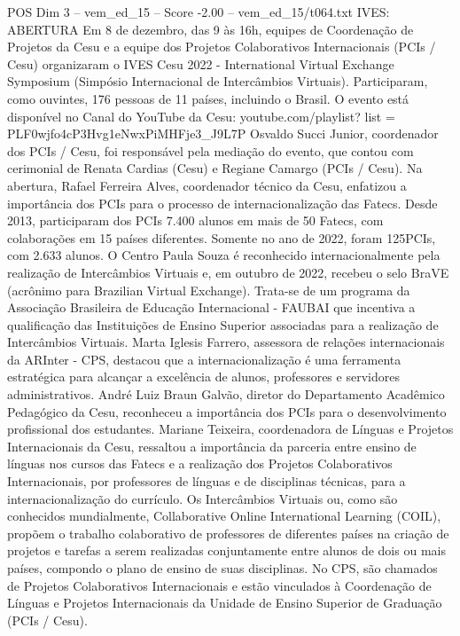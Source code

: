 \begin{textsample}{POS Dim 3 – vem\_ed\_15 – Score -2.00 – vem\_ed\_15/t064.txt}  \label{ex:f3_pos_087}
IVES: ABERTURA Em 8 de dezembro, das 9 às 16h, equipes de Coordenação de Projetos da Cesu e a equipe dos Projetos Colaborativos Internacionais (PCIs / Cesu) organizaram o IVES Cesu 2022 - International Virtual Exchange Symposium (Simpósio Internacional de Intercâmbios Virtuais).
Participaram, como ouvintes, 176 pessoas de 11 países, incluindo o Brasil.
O evento está disponível no Canal do YouTube da Cesu: youtube.com/playlist? list = PLF0wjfo4cP3Hvg1eNwxPiMHFje3\_J9L7P Osvaldo Succi Junior, coordenador dos PCIs / Cesu, foi responsável pela mediação do evento, que contou com cerimonial de Renata Cardias (Cesu) e Regiane Camargo (PCIs / Cesu).
Na abertura, Rafael Ferreira Alves, coordenador técnico da Cesu, enfatizou a importância dos PCIs para o processo de internacionalização das Fatecs.
Desde 2013, participaram dos PCIs 7.400 alunos em mais de 50 Fatecs, com colaborações em 15 países diferentes.
Somente no ano de 2022, foram 125PCIs, com 2.633 alunos.
O Centro Paula Souza é reconhecido internacionalmente pela realização de Intercâmbios Virtuais e, em outubro de 2022, recebeu o selo BraVE (acrônimo para Brazilian Virtual Exchange).
Trata-se de um programa da Associação Brasileira de Educação Internacional - FAUBAI que incentiva a qualificação das Instituições de Ensino Superior associadas para a realização de Intercâmbios Virtuais.
Marta Iglesis Farrero, assessora de relações internacionais da ARInter - CPS, destacou que a internacionalização é uma ferramenta estratégica para alcançar a excelência de alunos, professores e servidores administrativos.
André Luiz Braun Galvão, diretor do Departamento Acadêmico Pedagógico da Cesu, reconheceu a importância dos PCIs para o desenvolvimento profissional dos estudantes.
Mariane Teixeira, coordenadora de Línguas e Projetos Internacionais da Cesu, ressaltou a importância da parceria entre ensino de línguas nos cursos das Fatecs e a realização dos Projetos Colaborativos Internacionais, por professores de línguas e de disciplinas técnicas, para a internacionalização do currículo.
Os Intercâmbios Virtuais ou, como são conhecidos mundialmente, Collaborative Online International Learning (COIL), propõem o trabalho colaborativo de professores de diferentes países na criação de projetos e tarefas a serem realizadas conjuntamente entre alunos de dois ou mais países, compondo o plano de ensino de suas disciplinas.
No CPS, são chamados de Projetos Colaborativos Internacionais e estão vinculados à Coordenação de Línguas e Projetos Internacionais da Unidade de Ensino Superior de Graduação (PCIs / Cesu).

\end{textsample}
